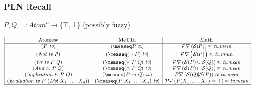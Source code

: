 \documentclass[aspectratio=169]{beamer}
\newcommand{\TEval}{\textit{Evaluation}}
\newcommand{\TList}{\textit{List}}
\newcommand{\TAnd}{\textit{And}}
\newcommand{\TOr}{\textit{Or}}
\newcommand{\TNot}{\textit{Not}}
\newcommand{\TImpl}{\textit{Implication}}
\newcommand{\TTV}{\textit{tv}}
\newcommand{\prob}[1]{\mathcal{Pr}\left(#1\right)}
\newcommand{\mean}{\textit{mean}}
\newcommand{\sat}[1]{\mathcal{S}(#1)}
\newcommand{\limp}{\rightarrow}
\begin{document}
\begin{frame}[fragile]



  \frametitle{PLN Recall}


$P, Q, \hdots: \textit{Atom}^n \rightarrow \{\top, \bot\}$
{\tiny \alert{(possibly fuzzy)}}

\renewcommand{\arraystretch}{1.5}

{\small
$$
\begin{array}{|c|c|c|}
  \hline
  \text{Atomese} & \text{MeTTa} & \text{Math} \\
  \hline
  (P\ \TTV) & (\measeq P\ \TTV) & \prob{\sat{P}} \approx \TTV.\mean \\
  (\TNot\ \TTV\ P) & (\measeq (\lnot\ P)\ \TTV) & \prob{\overline{\sat{P}}}
  \approx \TTV.\mean \\
  (\TOr\ \TTV\ P\ Q) & (\measeq (\lor\ P\ Q)\ \TTV) & \prob{\sat{P}
  \cup \sat{Q}} \approx \TTV.\mean \\
  (\TAnd\ \TTV\ P\ Q) & (\measeq (\land\ P\ Q)\ \TTV) & \prob{\sat{P}
  \cap \sat{Q}} \approx \TTV.\mean \\
  (\TImpl\ \TTV\ P\ Q) & (\measeq (P \limp Q)\ \TTV) &
  \prob{\sat{Q}|\sat{P}} \approx \TTV.\mean \\
  (\TEval\ \TTV\ P\ (\TList\ X_1\ \dots\ X_n)) & (\measeq (P\ X_1\ \dots\ X_n)\
  \TTV) & \prob{P(X_1, \dots, X_n)=\top} \approx \TTV.\mean \\
  \hline
\end{array}
$$
}
\renewcommand{\arraystretch}{1}

\end{frame}

\end{document}
